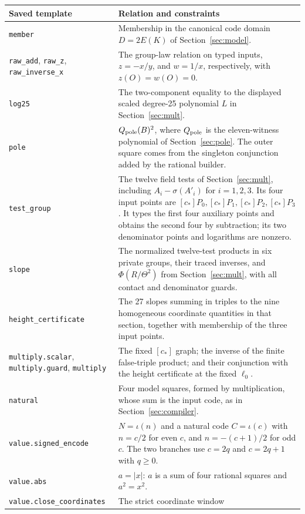 \begin{longtable}{p{}p{}}
\toprule Saved template & Relation and constraints\\\midrule\endhead
\nolinkurl{member} & Membership in the canonical code domain $D=2E(K)$
of Section~\ref{sec:model}.\\
\nolinkurl{raw_add}, \nolinkurl{raw_z}, \nolinkurl{raw_inverse_x} &
The group-law relation on typed inputs, $z=-x/y$, and $w=1/x$,
respectively, with $z(O)=w(O)=0$.\\
\nolinkurl{log25} & The two-component equality to the displayed
scaled degree-25 polynomial $L$ in Section~\ref{sec:mult}.\\
\nolinkurl{pole} & $Q_{\rm pole}(B)^2$, where $Q_{\rm pole}$ is the
eleven-witness polynomial of Section~\ref{sec:pole}. The outer square
comes from the singleton conjunction added by the rational builder.\\
\nolinkurl{test_group} & The twelve field tests of
Section~\ref{sec:mult}, including $A_i-\sigma(A'_i)$ for $i=1,2,3$.
Its four input points are $[c_*]P_0,[c_*]P_1,[c_*]P_2,[c_*]P_3$.
It types the first four auxiliary points and obtains the second four
by subtraction; its two denominator points and logarithms are nonzero.\\
\nolinkurl{slope} & The normalized twelve-test products in six private
groups, their traced inverses, and $\Phi(R/\Theta^2)$ from
Section~\ref{sec:mult}, with all contact and denominator guards.\\
\nolinkurl{height_certificate} & The 27 slopes summing in triples to
the nine homogeneous coordinate quantities in that section, together
with membership of the three input points.\\
\nolinkurl{multiply.scalar}, \nolinkurl{multiply.guard},
\nolinkurl{multiply} & The fixed $[c_*]$ graph; the inverse of the
finite false-triple product; and their conjunction with the height
certificate at the fixed $\ell_0$.\\
\nolinkurl{natural} & Four model squares, formed by multiplication,
whose sum is the input code, as in Section~\ref{sec:compiler}.\\
\nolinkurl{value.signed_encode} & $N=\iota(n)$ and a natural code
$C=\iota(c)$ with $n=c/2$ for even $c$, and $n=-(c+1)/2$ for odd
$c$. The two branches use $c=2q$ and $c=2q+1$ with $q\ge0$.\\
\nolinkurl{value.abs} & $a=|x|$: $a$ is a sum of four rational
squares and $a^2=x^2$.\\
\nolinkurl{value.close_coordinates} & The strict coordinate window

\end{longtable}
